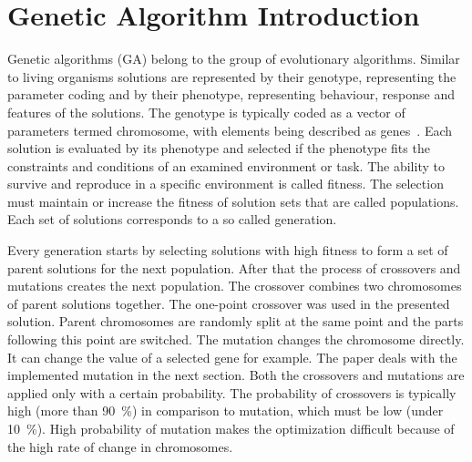 \section{Genetic Algorithm Introduction}

Genetic algorithms (GA) belong to the group of evolutionary algorithms. Similar to living organisms solutions are represented by their genotype, representing the parameter coding and by their phenotype, representing behaviour, response and features of the solutions. The genotype is typically coded as a vector of parameters termed chromosome, with elements being described as genes~\cite{Fogel2006}. Each solution is evaluated by its phenotype and selected if the phenotype fits the constraints and conditions of an examined environment or task. The ability to survive and reproduce in a specific environment is called fitness. The selection must maintain or increase the fitness of solution sets that are called populations. Each set of solutions corresponds to a so called generation.

Every generation starts by selecting solutions with high fitness to form a set of parent solutions for the next population. After that the process of crossovers and mutations creates the next population. The crossover combines two chromosomes of parent solutions together. The one-point crossover was used in the presented solution. Parent chromosomes are randomly split at the same point and the parts following this point are switched. The mutation changes the chromosome directly. It can change the value of a selected gene for example. The paper deals with the implemented mutation in the next section. Both the crossovers and mutations are applied only with a certain probability. The probability of crossovers is typically high (more than 90~\%) in comparison to mutation, which must be low (under 10~\%). High probability of mutation makes the optimization difficult because of the high rate of change in chromosomes.
